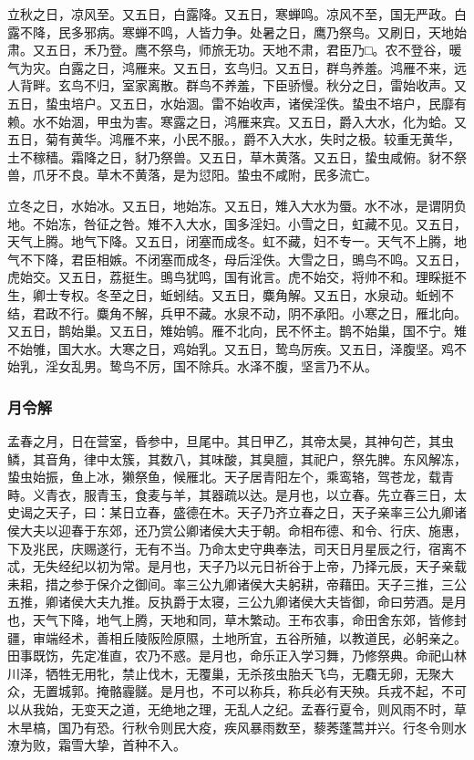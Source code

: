 \documentclass[]{article}
\begin{document}
立秋之日，凉风至。又五日，白露降。又五日，寒蝉鸣。凉风不至，国无严政。白露不降，民多邪病。寒蝉不鸣，人皆力争。处暑之日，鹰乃祭鸟。又刷日，天地始肃。又五日，禾乃登。鹰不祭鸟，师旅无功。天地不肃，君臣乃□。农不登谷，暖气为灾。白露之日，鸿雁来。又五日，玄鸟归。又五日，群鸟养羞。鸿雁不来，远人背畔。玄鸟不归，室家离散。群鸟不养羞，下臣骄慢。秋分之日，雷始收声。又五日，蛰虫培户。又五日，水始涸。雷不始收声，诸侯淫佚。蛰虫不培户，民靡有赖。水不始涸，甲虫为害。寒露之日，鸿雁来宾。又五日，爵入大水，化为蛤。又五日，菊有黄华。鸿雁不来，小民不服。，爵不入大水，失时之极。较重无黄华，土不稼穑。霜降之日，豺乃祭兽。又五日，草木黄落。又五日，蛰虫咸俯。豺不祭兽，爪牙不良。草木不黄落，是为愆阳。蛰虫不咸附，民多流亡。

立冬之日，水始冰。又五日，地始冻。又五日，雉入大水为蜃。水不冰，是谓阴负地。不始冻，咎征之咎。雉不入大水，国多淫妇。小雪之日，虹藏不见。又五日，天气上腾。地气下降。又五日，闭塞而成冬。虹不藏，妇不专一。天气不上腾，地气不下降，君臣相嫉。不闭塞而成冬，母后淫佚。大雪之日，鴠鸟不鸣。又五日，虎始交。又五日，荔挺生。鴠鸟犹鸣，国有讹言。虎不始交，将帅不和。理睬挺不生，卿士专权。冬至之日，蚯蚓结。又五日，麋角解。又五日，水泉动。蚯蚓不结，君政不行。麋角不解，兵甲不藏。水泉不动，阴不承阳。小寒之日，雁北向。又五日，鹊始巢。又五日，雉始鸲。雁不北向，民不怀主。鹊不始巢，国不宁。雉不始雊，国大水。大寒之日，鸡始乳。又五日，鸷鸟厉疾。又五日，泽腹坚。鸡不始乳，淫女乱男。鸷鸟不厉，国不除兵。水泽不腹，坚言乃不从。

\hypertarget{header-n283}{%
\subsubsection{月令解}\label{header-n283}}

孟春之月，日在营室，昏参中，旦尾中。其日甲乙，其帝太昊，其神句芒，其虫鳞，其音角，律中太簇，其数八，其味酸，其臭膻，其祀户，祭先脾。东风解冻，蛰虫始振，鱼上冰，獭祭鱼，候雁北。天子居青阳左个，乘鸾辂，驾苍龙，载青畤。义青衣，服青玉，食麦与羊，其器疏以达。是月也，以立春。先立春三日，太史谒之天子，曰：某日立春，盛德在木。天子乃齐立春之日，天子亲率三公九卿诸侯大夫以迎春于东郊，还乃赏公卿诸侯大夫于朝。命相布德、和令、行庆、施惠，下及兆民，庆赐遂行，无有不当。乃命太史守典奉法，司天日月星辰之行，宿离不忒，无失经纪以初为常。是月也，天子乃以元日祈谷于上帝，乃择元辰，天子亲载耒耜，措之参于保介之御间。率三公九卿诸侯大夫躬耕，帝藉田。天子三推，三公五推，卿诸侯大夫九推。反执爵于太寝，三公九卿诸侯大夫皆御，命曰劳酒。是月也，天气下降，地气上腾，天地和同，草木繁动。王布农事，命田舍东郊，皆修封疆，审端经术，善相丘陵阪险原隰，土地所宜，五谷所殖，以教道民，必躬亲之。田事既饬，先定准直，农乃不惑。是月也，命乐正入学习舞，乃修祭典。命祀山林川泽，牺牲无用牝，禁止伐木，无覆巢，无杀孩虫胎夭飞鸟，无麛无卵，无聚大众，无置城郭。掩骼霾髊。是月也，不可以称兵，称兵必有天殃。兵戎不起，不可以从我始，无变天之道，无绝地之理，无乱人之纪。孟春行夏令，则风雨不时，草木旱槁，国乃有恐。行秋令则民大疫，疾风暴雨数至，藜莠蓬蒿并兴。行冬令则水潦为败，霜雪大挚，首种不入。
\end{document}
